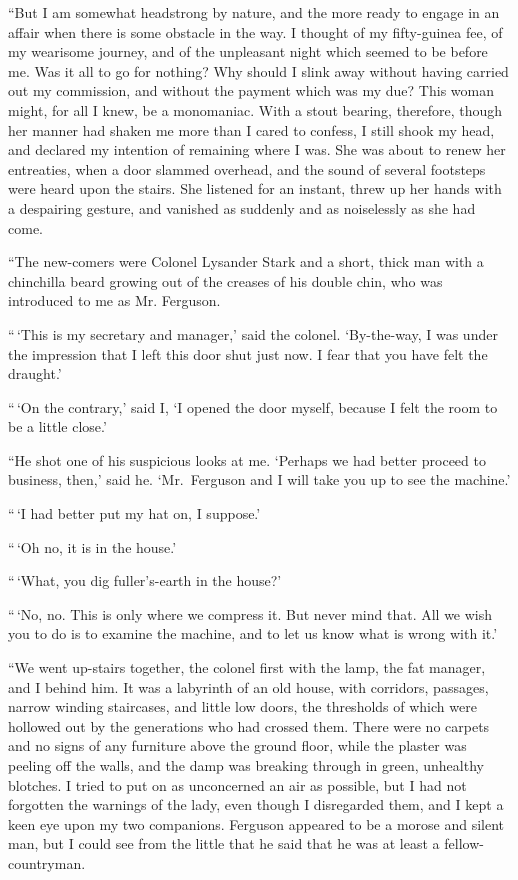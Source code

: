 “But I am somewhat headstrong by nature, and the more
ready to engage in an affair when there is some obstacle in
the way. I thought of my fifty-guinea fee, of my wearisome
journey, and of the unpleasant night which seemed to be before
me. Was it all to go for nothing? Why should I slink
away without having carried out my commission, and without
the payment which was my due? This woman might, for all
I knew, be a monomaniac. With a stout bearing, therefore,
though her manner had shaken me more than I cared to confess,
I still shook my head, and declared my intention of remaining
where I was. She was about to renew her entreaties,
when a door slammed overhead, and the sound of several
footsteps were heard upon the stairs. She listened for an instant,
threw up her hands with a despairing gesture, and vanished
as suddenly and as noiselessly as she had come.

“The new-comers were Colonel Lysander Stark and a short,
thick man with a chinchilla beard growing out of the creases
of his double chin, who was introduced to me as Mr.
Ferguson.

“\,‘This is my secretary and manager,’ said the colonel.
‘By-the-way, I was under the impression that I left this door
shut just now. I fear that you have felt the draught.’

“\,‘On the contrary,’ said I, ‘I opened the door myself, because
I felt the room to be a little close.’

“He shot one of his suspicious looks at me. ‘Perhaps we
had better proceed to business, then,’ said he. ‘Mr.~Ferguson
and I will take you up to see the machine.’

“\,‘I had better put my hat on, I suppose.’

“\,‘Oh no, it is in the house.’

“\,‘What, you dig fuller’s-earth in the house?’

“\,‘No, no. This is only where we compress it. But never
mind that. All we wish you to do is to examine the
machine, and to let us know what is wrong with it.’

“We went up-stairs together, the colonel first with the
lamp, the fat manager, and I behind him. It was a labyrinth
of an old house, with corridors, passages, narrow winding
staircases, and little low doors, the thresholds of which were
hollowed out by the generations who had crossed them.
There were no carpets and no signs of any furniture above
the ground floor, while the plaster was peeling off the walls,
and the damp was breaking through in green, unhealthy
blotches. I tried to put on as unconcerned an air as possible,
but I had not forgotten the warnings of the lady, even
though I disregarded them, and I kept a keen eye upon my
two companions. Ferguson appeared to be a morose and
silent man, but I could see from the little that he said that
he was at least a fellow-countryman.


